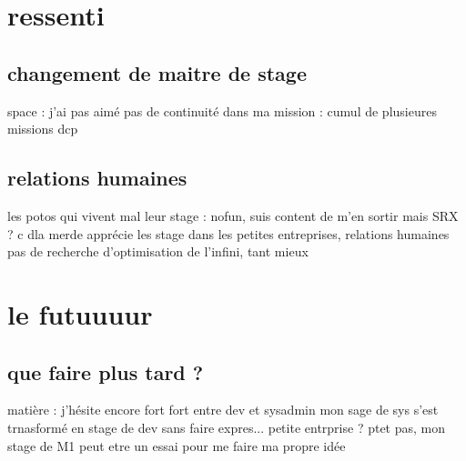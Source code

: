 \section{ressenti}
\subsection{changement de maitre de stage}
space : j'ai pas aimé
pas de continuité dans ma mission : cumul de plusieures missions dcp

\subsection{relations humaines}
les potos qui vivent mal leur stage : nofun, suis content de m'en sortir mais SRX ? c dla merde
apprécie les stage dans les petites entreprises, relations humaines
pas de recherche d'optimisation de l'infini, tant mieux

\section{le futuuuur}
\subsection{que faire plus tard ?}
matière : j'hésite encore fort fort entre dev et sysadmin
mon sage de sys s'est trnasformé en stage de dev sans faire expres...
petite entrprise ? ptet pas, mon stage de M1 peut etre un essai pour me faire ma propre idée

